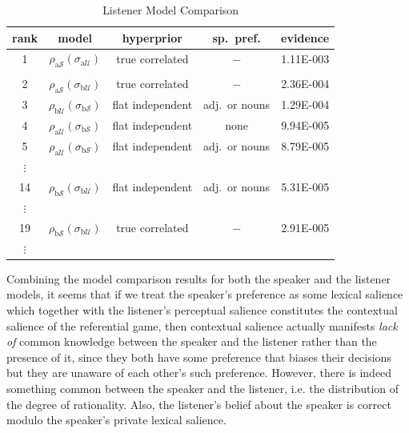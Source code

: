 \begin{table}[htb] 
\caption{Listener Model Comparison}
  \centering 
  \begin{tabular}{ccccc}
    rank
    & model
    & hyperprior
    & sp.~pref.
    & evidence 
    \\ \hline
    1 
    & $\rho_{\mathrm{a}\mathcal{S}}(\sigma_{\mathrm{a}\mathcal{U}})$
    & true correlated
    & $-$
    & 1.11E-003
    \\ \\
    2 
    & $\rho_{\mathrm{ a}\mathcal{S}}(\sigma_{\mathrm{b}\mathcal{U}})$
    & true correlated
    & $-$
    & 2.36E-004
    \\     
    3 
    & $\rho_{\mathrm{b}\mathcal{U}}(\sigma_{\mathrm{b}\mathcal{S}})$
    & flat independent \quad
    & adj.~or nouns \quad
    & 1.29E-004
    \\     
    4 
    & $\rho_{\mathrm{a}\mathcal{U}}(\sigma_{\mathrm{b}\mathcal{S}})$
    & flat independent
    & none
    & 9.94E-005
    \\     
    5 
    & $\rho_{\mathrm{a}\mathcal{U}}(\sigma_{\mathrm{b}\mathcal{S}})$
    & flat independent
    & adj.~or nouns
    & 8.79E-005
    \\
    $\vdots$\\
    14 
    & $\rho_{\mathrm{b}\mathcal{S}}(\sigma_{\mathrm{b}\mathcal{U}})$
    & flat independent
    & adj.~or nouns
    & 5.31E-005
    \\
    $\vdots$\\
    19 
    & $\rho_{\mathrm{b}\mathcal{S}}(\sigma_{\mathrm{b}\mathcal{U}})$
    & true correlated
    & $-$
    & 2.91E-005
    \\
    $\vdots$
  \end{tabular}
  \label{table:listener mod}
\end{table}

Combining the model comparison results for both the speaker and the listener models, it seems that if we treat the speaker's preference as some lexical salience which together with the listener's perceptual salience constitutes the contextual salience of the referential game, then contextual salience actually manifests \emph{lack of} common knowledge between the speaker and the listener rather than the presence of it, since they both have some preference that biases their decisions but they are unaware of each other's such preference. However, there is indeed something common between the speaker and the listener, i.e. the distribution of the degree of rationality. Also, the listener's belief about the speaker is correct modulo the speaker's private lexical salience. 


